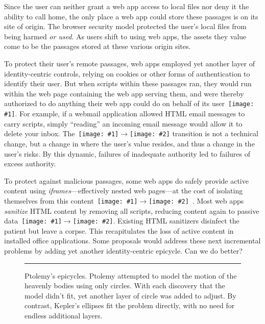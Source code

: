 \documentclass[letterpaper,twocolumn,10pt]{article}
\newcommand{\q}[1]{{\texttt{[image: \#1]}}}
\newcommand{\qq}[2]{{\texttt{[image: \#1]}}$\rightarrow${\texttt{[image: \#2]}}}
\begin{document}
Since the user can neither grant a web app access to local files nor deny it 
the ability to call home, the only place a web app could store these passages 
is on its site of origin. The browser security model protected the user's 
local files from being harmed \emph{or used}. As users shift to using web 
apps, the assets they value come to be the passages stored at these various 
origin sites. 

To protect their user's remote passages, web apps employed yet another layer 
of identity-centric controls, relying on cookies or other forms of 
authentication to identify their user. But when scripts within these passages 
ran, they would run within the web page containing the web app serving them, 
and were thereby authorized to do anything their web app could do on behalf 
of its user~\q{4}. For example, if a webmail application allowed HTML email 
messages to carry scripts, simply ``reading'' an incoming email message would 
allow it to delete your inbox. The~\qq{3}{4} transition is not a technical 
change, but a change in where the user's value resides, and thus a change in 
the user's risks. By this dynamic, failures of inadequate authority led to 
failures of excess authority.

To protect against malicious passages, some web apps do safely provide active 
content using \emph{iframes}---effectively nested web pages---at the cost of 
isolating themselves from this content~\qq{4}{3}~\cite{mashupos}. Most web 
apps \emph{sanitize} HTML content by removing all scripts, reducing content 
again to passive data~\qq{4}{1}. Existing HTML sanitizers disinfect the 
patient but leave a corpse. This recapitulates the loss of active content in 
installed office applications. Some proposals would address these next 
incremental problems by adding yet another identity-centric 
epicycle. Can we do better?

\begin{figure}[t!]

  \caption[Ptolemy's epicycles.]{Ptolemy's epicycles. Ptolemy attempted to
  model the motion of the heavenly bodies using only circles. With each
  discovery that the model didn't fit, yet another layer of circle was added
  to adjust. By contrast, Kepler's ellipses fit the problem directly, with no
  need for endless additional layers. 
  \\ } \hrule
  \label{fig:epicycle}
\end{figure}
\end{document}
